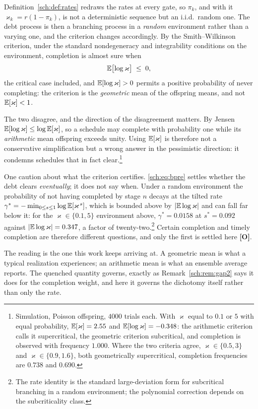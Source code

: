 \begin{remark}\label{sch:rem:bpre}
Definition~\ref{sch:def:rates} redraws the rates at every gate, so
$\pi_k$, and with it $\varkappa_k=r(1-\pi_k)$, is not a deterministic
sequence but an i.i.d.\ random one. The debt process is then a branching
process in a \emph{random} environment rather than a varying one, and the
criterion changes accordingly. By the Smith--Wilkinson criterion, under the standard nondegeneracy
and integrability conditions on the environment, completion is almost
sure when
\begin{equation}\label{sch:eq:bpre}
\mathbb{E}\bigl[\log \varkappa\bigr]\;\le\;0,
\end{equation}
the critical case included, and $\mathbb{E}[\log\varkappa]>0$ permits a positive
probability of never completing: the criterion is the \emph{geometric}
mean of the offspring means, and not $\mathbb{E}[\varkappa]<1$.

The two disagree, and the direction of the disagreement matters. By
Jensen $\mathbb{E}[\log \varkappa]\le\log\mathbb{E}[\varkappa]$, so a schedule may complete with
probability one while its \emph{arithmetic} mean offspring exceeds
unity. Using $\mathbb{E}[\varkappa]$ is therefore not a conservative simplification but
a wrong answer in the pessimistic direction: it condemns schedules that
in fact clear.\footnote{Simulation, Poisson offspring, $4000$ trials
each. With $\varkappa$ equal to $0.1$ or $5$ with equal probability,
$\mathbb{E}[\varkappa]=2.55$ and $\mathbb{E}[\log \varkappa]=-0.348$: the arithmetic criterion calls it
supercritical, the geometric criterion subcritical, and completion is
observed with frequency $1.000$. Where the two criteria agree, $\varkappa\in\{0.5,3\}$ and $\varkappa\in\{0.9,1.6\}$, both geometrically supercritical, completion frequencies are $0.738$ and $0.690$.}

One caution about what the criterion certifies. \eqref{sch:eq:bpre}
settles whether the debt clears \emph{eventually}; it does not say when.
Under a random environment the probability of not having completed by
stage $n$ decays at the tilted rate
$\gamma^\ast=-\min_{0\le s\le1}\log\mathbb{E}[\varkappa^{\,s}]$, which is bounded
above by $|\mathbb{E}\log\varkappa|$ and can fall far below it: for the
$\varkappa\in\{0.1,5\}$ environment above, $\gamma^\ast=0.0158$ at
$s^\ast=0.092$ against $|\mathbb{E}\log\varkappa|=0.347$, a factor of
twenty-two.\footnote{The rate identity is the standard large-deviation
form for subcritical branching in a random environment; the polynomial
correction depends on the subcriticality class.} Certain completion and
timely completion are therefore different questions, and only the first
is settled here \textbf{[O]}.

The reading is the one this work keeps arriving at. A geometric mean is
what a typical realization experiences; an arithmetic mean is what an
ensemble average reports. The quenched quantity governs, exactly as
Remark~\ref{sch:rem:gap2} says it does for the completion weight, and
here it governs the dichotomy itself rather than only the rate.
\end{remark}

